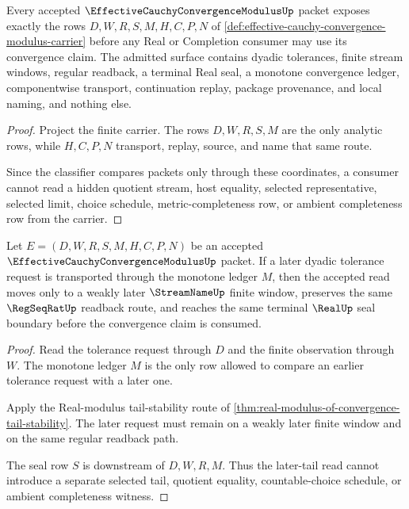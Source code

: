 \begin{theorem}
\label{thm:effective-cauchy-convergence-modulus-carrier-admission}
Every accepted $\EffectiveCauchyConvergenceModulusUp$ packet exposes exactly the rows $D,W,R,S,M,H,C,P,N$ of \autoref{def:effective-cauchy-convergence-modulus-carrier} before any Real or Completion consumer may use its convergence claim. The admitted surface contains dyadic tolerances, finite stream windows, regular readback, a terminal Real seal, a monotone convergence ledger, componentwise transport, continuation replay, package provenance, and local naming, and nothing else.
\end{theorem}
\begin{proof}
Project the finite carrier. The rows $D,W,R,S,M$ are the only analytic rows, while $H,C,P,N$ transport, replay, source, and name that same route.

Since the classifier compares packets only through these coordinates, a consumer cannot read a hidden quotient stream, host equality, selected representative, selected limit, choice schedule, metric-completeness row, or ambient completeness row from the carrier.
\end{proof}

\begin{theorem}
\label{thm:effective-cauchy-convergence-modulus-monotone-tail-window-stability}
Let $E=(D,W,R,S,M,H,C,P,N)$ be an accepted $\EffectiveCauchyConvergenceModulusUp$ packet. If a later dyadic tolerance request is transported through the monotone ledger $M$, then the accepted read moves only to a weakly later $\StreamNameUp$ finite window, preserves the same $\RegSeqRatUp$ readback route, and reaches the same terminal $\RealUp$ seal boundary before the convergence claim is consumed.
\end{theorem}
\begin{proof}
Read the tolerance request through $D$ and the finite observation through $W$. The monotone ledger $M$ is the only row allowed to compare an earlier tolerance request with a later one.

Apply the Real-modulus tail-stability route of \autoref{thm:real-modulus-of-convergence-tail-stability}. The later request must remain on a weakly later finite window and on the same regular readback path.

The seal row $S$ is downstream of $D,W,R,M$. Thus the later-tail read cannot introduce a separate selected tail, quotient equality, countable-choice schedule, or ambient completeness witness.
\end{proof}

